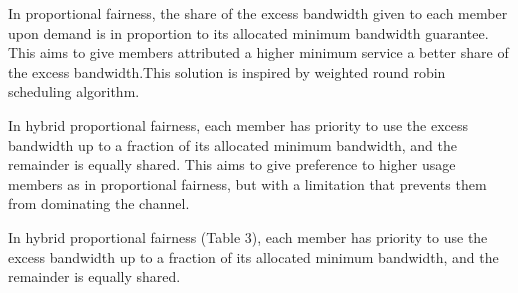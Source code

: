 \documentclass[accepted,single]{gipaper}
\begin{document}
In proportional fairness, the share of the excess bandwidth given to each member upon demand is in proportion to its allocated minimum bandwidth guarantee. This aims to give members attributed a higher minimum service a better share of the excess bandwidth.This solution is inspired by weighted round robin scheduling algorithm.

In hybrid proportional fairness, each member has priority to use the excess bandwidth up to a fraction of its allocated minimum bandwidth, and the remainder is equally shared. This aims to give preference to higher usage members as in proportional fairness, but with a limitation that prevents them from dominating the channel.

\iffalse
In hybrid proportional fairness (Table 3), each member has priority to use the excess bandwidth up to a fraction of its allocated minimum bandwidth, and the remainder is equally shared. \\
\end{document}
